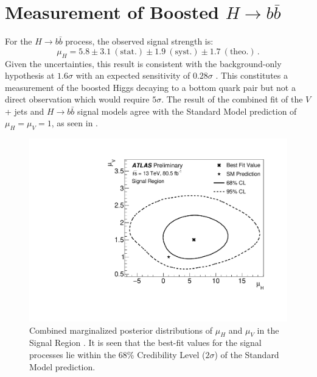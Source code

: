 \section{Measurement of Boosted $H \rightarrow b\bar{b}$} \label{sec:results:procedure}

For the $H \rightarrow b\bar{b}$ process, the observed signal strength is:
%
$$ \mu_{H} = 5.8 \pm 3.1~\mathrm{(stat.)} \pm 1.9~\mathrm{(syst.)} \pm 1.7~\mathrm{(theo.)}\,. $$
%
Given the uncertainties, this result is consistent with the background-only
hypothesis at $1.6\sigma$ with an expected sensitivity of $0.28\sigma$
\cite{Feickert:HiggsCouplings2018}.  This constitutes a measurement of the
boosted Higgs decaying to a bottom quark pair but not a direct observation
which would require $5\sigma$. The result of the combined fit of the $V$ + jets
and $H \rightarrow b\bar{b}$ signal models agree with the Standard
Model prediction of $\mu_{H} = \mu_{V} = 1$, as seen in
.
%
\begin{figure}
\centering
\includegraphics[width=.6\linewidth]{figures/results/contour}
\caption{
Combined marginalized posterior distributions of $\mu_{H}$ and $\mu_{V}$ in the
Signal Region \cite{ATLAS-CONF-2018-052}.  It is seen that the best-fit values for the signal processes
lie within the 68\% Credibility Level ($2\sigma$) of the Standard Model
prediction.}
\label{sec:results:contour}
\end{figure}
